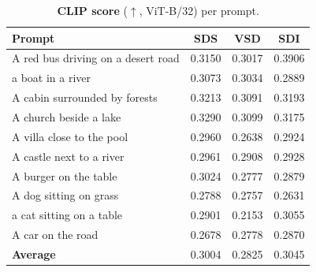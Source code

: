 \begin{table}[t]
  \centering
  \footnotesize
  \caption{\textbf{CLIP score} ($\uparrow$, ViT-B/32) per prompt.}
  \label{tab:clip}
  \begin{tabular}{@{}lccc@{}}
    \toprule
    Prompt & SDS & VSD & SDI \\
    \midrule
    A red bus driving on a desert road & 0.3150 & 0.3017 & 0.3906 \\
    a boat in a river & 0.3073 & 0.3034 & 0.2889 \\
    A cabin surrounded by forests & 0.3213 & 0.3091 & 0.3193 \\
    A church beside a lake & 0.3290 & 0.3099 & 0.3175 \\
    A villa close to the pool & 0.2960 & 0.2638 & 0.2924 \\
    A castle next to a river & 0.2961 & 0.2908 & 0.2928 \\
    A burger on the table & 0.3024 & 0.2777 & 0.2879 \\
    A dog sitting on grass & 0.2788 & 0.2757 & 0.2631 \\
    a cat sitting on a table & 0.2901 & 0.2153 & 0.3055 \\
    A car on the road & 0.2678 & 0.2778 & 0.2870 \\
    \midrule
    \textbf{Average} & 0.3004 & 0.2825 & 0.3045 \\
    \bottomrule
  \end{tabular}
\end{table}
